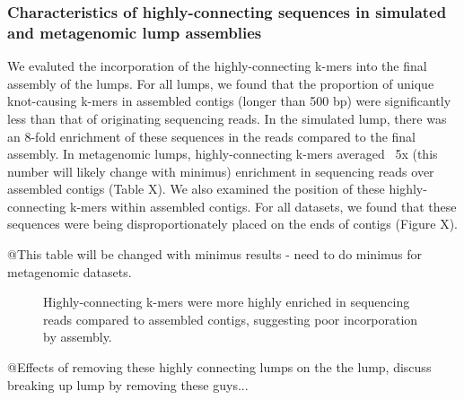 \documentclass[11pt]{article} %
\begin{document}
\subsubsection{Characteristics of highly-connecting sequences in simulated and metagenomic lump assemblies}

We evaluted the incorporation of the highly-connecting k-mers into the final assembly of the lumps.  For all lumps, we found that the proportion of unique knot-causing k-mers in assembled contigs (longer than 500 bp) were significantly less than that of originating sequencing reads.  In the simulated lump, there was an 8-fold enrichment of these sequences in the reads compared to the final assembly.  In metagenomic lumps, highly-connecting k-mers averaged ~5x (this number will likely change with minimus) enrichment in sequencing reads over assembled contigs (Table X).  We also examined the position of these highly-connecting k-mers within assembled contigs.  For all datasets, we found that these sequences were being disproportionately placed on the ends of contigs (Figure X).  

@This table will be changed with minimus results - need to do minimus for metagenomic datasets.

\begin{figure}
\caption{Highly-connecting k-mers were more highly enriched in sequencing reads compared to assembled contigs, suggesting poor incorporation by assembly.}
\end{figure}

@Effects of removing these highly connecting lumps on the the lump, discuss breaking up lump by removing these guys...
\end{document}
